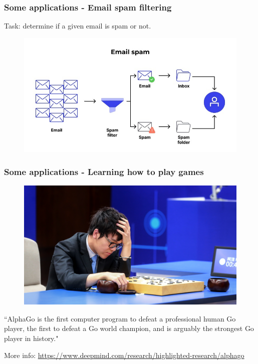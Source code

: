 \documentclass{beamer}
\begin{document}
	\begin{frame}
		\frametitle{Some applications - Email spam filtering}
		Task: determine if a given email is spam or not.
		\begin{figure}
			\centering
			\includegraphics[scale=0.5]{images/spam-filtering-1}
		\end{figure}
	\end{frame}

	\begin{frame}
		\frametitle{Some applications - Learning how to play games}
		\begin{figure}
			\centering
			\includegraphics[scale=0.3]{images/alphago}
		\end{figure}
	``AlphaGo is the first computer program to defeat a professional human Go player, the first to defeat a Go world champion, and is arguably the strongest Go player in history." 
	
	More info: \href{https://www.deepmind.com/research/highlighted-research/alphago}{https://www.deepmind.com/research/highlighted-research/alphago}
	\end{frame}
\end{document}
